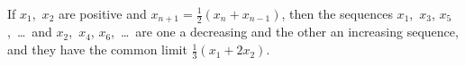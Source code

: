 If $x_{1}$,~$x_{2}$ are positive and $x_{n+1} = \frac{1}{2} (x_{n} + x_{n-1})$, then the sequences $x_{1}$,~$x_{3}$,
$x_{5}$,~\dots\ and $x_{2}$,~$x_{4}$, $x_{6}$,~\dots\ are one a decreasing and the other an increasing
sequence, and they have the common limit $\frac{1}{3}(x_{1} + 2x_{2})$.


